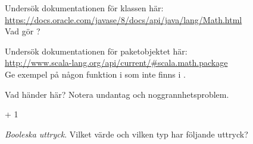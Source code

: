 {{{{{\Subtask Undersök dokumentationen för klassen  här: \\ \url{https://docs.oracle.com/javase/8/docs/api/java/lang/Math.html} \\
Vad gör ?

\Subtask Undersök dokumentationen för paketobjektet  här: \\
\url{http://www.scala-lang.org/api/current/#scala.math.package} \\
Ge exempel på någon funktion i  som inte finns i .


\Task Vad händer här? Notera undantag  och noggrannhetsproblem. %

\Subtask {} + 1

\Subtask {}

\Subtask {}

\Subtask {}

\Subtask {}

\Subtask {}

\Subtask {}

\Subtask {}

\Subtask {}

\Subtask {}


\Task \textit{Booleska uttryck}. Vilket värde och vilken typ har följande uttryck?  %

\Subtask {}

\Subtask {}

\Subtask {}

\Subtask {}

\Subtask {}

\Subtask {}

\Subtask {}

\Subtask {}

\Subtask {}

\Subtask {}

\Subtask {}

\Subtask {}

}}}}}
